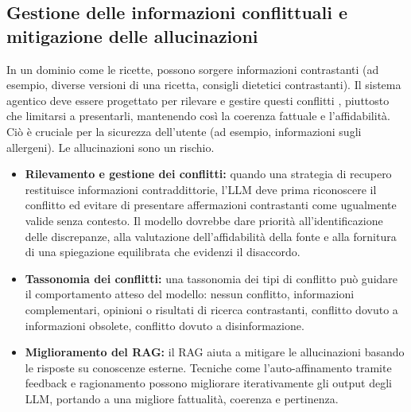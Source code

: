 \documentclass[a4paper, 11pt]{article}
\begin{document}
\subsection{Gestione delle informazioni conflittuali e mitigazione delle allucinazioni}
In un dominio come le ricette, possono sorgere informazioni contrastanti (ad esempio, diverse versioni di una ricetta, consigli dietetici contrastanti). Il sistema agentico deve essere progettato per rilevare e gestire questi conflitti \cite{dragged_into_conflicts}, piuttosto che limitarsi a presentarli, mantenendo così la coerenza fattuale e l'affidabilità. Ciò è cruciale per la sicurezza dell'utente (ad esempio, informazioni sugli allergeni). Le allucinazioni sono un rischio. \cite{mastering_rag_reranking}
\begin{itemize}
    \item \textbf{Rilevamento e gestione dei conflitti:} quando una strategia di recupero restituisce informazioni contraddittorie, l'LLM deve prima riconoscere il conflitto ed evitare di presentare affermazioni contrastanti come ugualmente valide senza contesto. \cite{milvus_contradictory_info} Il modello dovrebbe dare priorità all'identificazione delle discrepanze, alla valutazione dell'affidabilità della fonte e alla fornitura di una spiegazione equilibrata che evidenzi il disaccordo. \cite{milvus_contradictory_info}
    \item \textbf{Tassonomia dei conflitti:} una tassonomia dei tipi di conflitto può guidare il comportamento atteso del modello: nessun conflitto, informazioni complementari, opinioni o risultati di ricerca contrastanti, conflitto dovuto a informazioni obsolete, conflitto dovuto a disinformazione. \cite{dragged_into_conflicts}
    \item \textbf{Miglioramento del RAG:} il RAG aiuta a mitigare le allucinazioni basando le risposte su conoscenze esterne. \cite{beyond_traditional_finetuning} Tecniche come l'auto-affinamento tramite feedback e ragionamento possono migliorare iterativamente gli output degli LLM, portando a una migliore fattualità, coerenza e pertinenza. \cite{beyond_traditional_finetuning}
\end{itemize}
\end{document}
